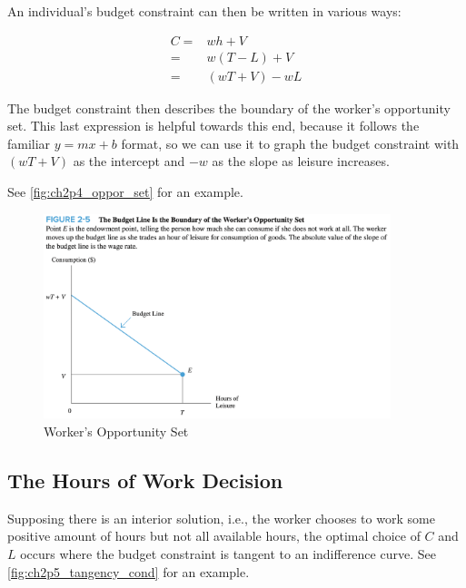 An individual's budget constraint can then be written in 
various ways:

\begin{align}
    C=&w h+V \\
    =&w(T-L)+V \\
    =&(w T+V)-w L
\end{align}

The budget constraint then describes the boundary of the
worker's opportunity set.
This last expression is helpful towards this end, because it 
follows the familiar $y = mx + b$ format,
so we can use it to graph the budget constraint
with $(w T+V)$ as the intercept and $-w$ as the slope
as leisure increases.

See \autoref{fig:ch2p4_oppor_set} for an example.

\FloatBarrier

\begin{figure}[!htb]
    \centering
        \includegraphics[width=0.9\textwidth]{../input/ch_2p4_oppor_set.png}
    \caption{Worker's Opportunity Set}
    \label{fig:ch2p4_oppor_set}
\end{figure}

\FloatBarrier

\subsection{The Hours of Work Decision}

Supposing there is an interior solution, i.e., the 
worker chooses to work some positive amount of hours but not all available hours,
the optimal choice of $C$ and $L$ occurs 
where the budget constraint is tangent to an indifference curve.
See \autoref{fig:ch2p5_tangency_cond} for an example.


